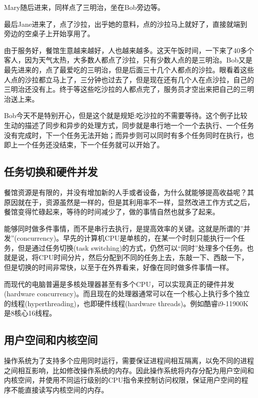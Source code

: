 \documentclass[12pt]{article}
\begin{document}
Mary随后进来，同样点了三明治，坐在Bob旁边等。

最后Jane进来了，点了沙拉，出乎她的意料，点的沙拉马上就好了，直接就端到旁边的空桌子上开始享用了。

由于服务好，餐馆生意越来越好，人也越来越多。这天午饭时间，一下来了40多个客人，因为天气太热，大多数人都点了沙拉，只有少数人点的是三明治。Bob又是最先进来的，点了最爱吃的三明治，但是后面三十几个人都点的沙拉。眼看着这些人点的沙拉都立马上了，三分钟也过去了，但是现在还有几个人在点沙拉，自己的三明治还没有上。终于等这些吃沙拉的人都点完了，服务员才空出来把自己的三明治送上来。

Bob今天不是特别开心，但是这个就是规矩:吃沙拉的不需要等待。这个例子比较生动的描述了同步和异步的处理方式，同步就是串行地一个一个去执行、一个任务没有完成时，下一个任务无法开始；而异步则可以同时有多个任务同时在执行，也即上一个任务还没结束，下一个任务就可以开始了。

\subsection{任务切换和硬件并发}\label{ux4efbux52a1ux5207ux6362ux548cux786cux4ef6ux5e76ux53d1}

餐馆资源是有限的，并没有增加新的人手或者设备，为什么就能够提高收益呢？其原因就在于，资源虽然是一样的，但是其利用率不一样，显然改进工作方式之后，餐馆变得忙碌起来，等待的时间减少了，做的事情自然也就多了起来。

能够同时做多件事情，而不是串行去执行，是提高效率的关键。这就是所谓的''并发''(concurrency)。早先的计算机CPU是单核的，在某一个时刻只能执行一个任务，但是通过任务切换(task switching)的方式，仍然可以``同时''处理多个任务。也就是说，将CPU时间分片，然后分配到不同的任务上去，东敲一下、西敲一下，但是切换的时间非常快，以至于在外界看来，好像在同时做多件事情一样。

而现代的电脑普遍是多核处理器甚至有多个CPU，可以实现真正的硬件并发(hardware concurrency)。而且现在的处理器通常可以在一个核心上执行多个独立的线程(hyperthreading)，也即硬件线程(hardware threads)。例如酷睿i9-11900K 是8核心16线程。

\subsection{用户空间和内核空间}\label{ux7528ux6237ux7a7aux95f4ux548cux5185ux6838ux7a7aux95f4}

操作系统为了支持多个应用同时运行，需要保证进程间相互隔离，以免不同的进程之间相互影响，比如修改操作系统的内存。因此操作系统将内存分配为用户空间和内核空间，并使用不同运行级别的CPU指令来控制访问权限，保证用户空间的程序不能直接读写内核空间的内存。
\end{document}
